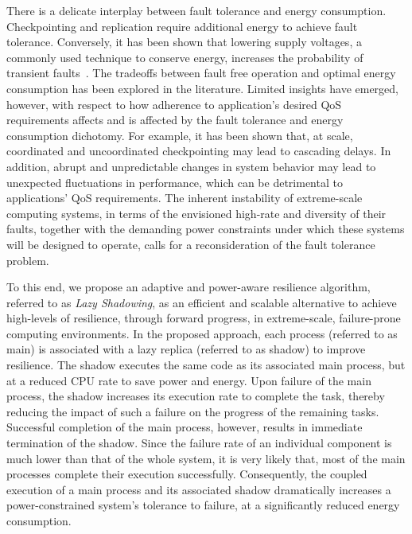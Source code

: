 There is a delicate interplay between fault tolerance and energy consumption. Checkpointing and replication require additional energy to achieve fault tolerance. Conversely, it has been shown that lowering supply voltages, a commonly used technique to conserve energy, increases the probability of transient faults~\cite{chandra2008defect,zhu2004fail}. The tradeoffs between fault free operation and optimal energy consumption has been explored in the literature. Limited insights have emerged, however, with respect to how adherence to application's desired QoS requirements affects and is affected by the fault tolerance and energy consumption dichotomy. For example, it has been shown that, at scale, coordinated and uncoordinated checkpointing may lead to cascading delays. %
In addition, abrupt and unpredictable changes in system behavior may lead to unexpected fluctuations in performance, which can be detrimental to applications' QoS requirements. The inherent instability of extreme-scale computing systems, in terms of the envisioned high-rate and diversity of their faults, together with the demanding power constraints under which these systems will be designed to operate, calls for a reconsideration of the fault tolerance problem.

To this end, we propose an adaptive and power-aware resilience algorithm, referred to as \textit{Lazy
Shadowing}, as an efficient and scalable alternative to achieve high-levels of resilience, through
forward progress, in extreme-scale, failure-prone computing environments. In the proposed
approach, each process (referred to as main) is associated with a lazy replica (referred to as shadow) to improve resilience. The shadow executes the same code as its
associated main process, but at a reduced CPU rate to save power and energy. %
Upon failure of the main process, the shadow increases its 
execution rate to complete the task, thereby reducing the impact of such a failure on the progress of
the remaining tasks. Successful completion of the main process, however, results in immediate
termination of the shadow. Since the failure rate of an individual component is much lower than that of 
the whole system, it is very likely that, most of the main processes complete their execution
successfully. Consequently, the coupled execution of a main process and its associated shadow 
dramatically increases a power-constrained system's tolerance to failure, at a significantly reduced
energy consumption.

